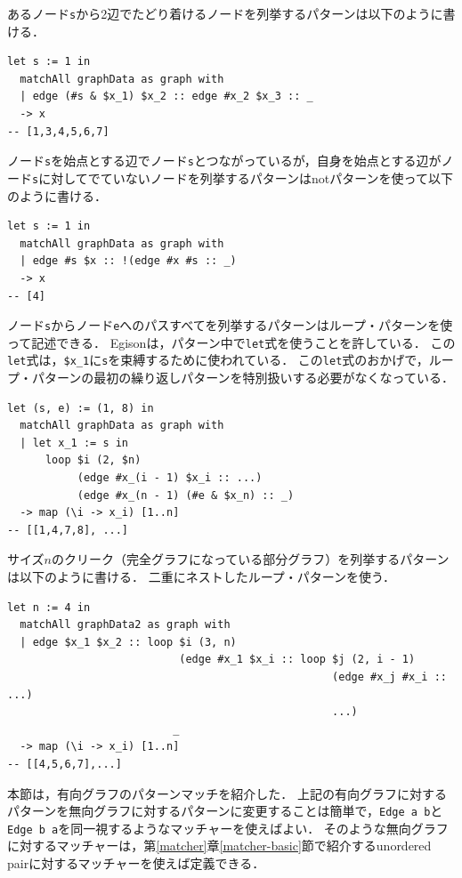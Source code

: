 あるノード\lstinline{s}から2辺でたどり着けるノードを列挙するパターンは以下のように書ける．
\begin{lstlisting}[language=egison,numbers=none]
let s := 1 in
  matchAll graphData as graph with
  | edge (#s & $x_1) $x_2 :: edge #x_2 $x_3 :: _
  -> x
-- [1,3,4,5,6,7]
\end{lstlisting}
ノード\lstinline{s}を始点とする辺でノード\lstinline{s}とつながっているが，自身を始点とする辺がノード\lstinline{s}に対してでていないノードを列挙するパターンはnotパターンを使って以下のように書ける．
\begin{lstlisting}[language=egison,numbers=none]
let s := 1 in
  matchAll graphData as graph with
  | edge #s $x :: !(edge #x #s :: _)
  -> x
-- [4]
\end{lstlisting}
ノード\lstinline{s}からノード\lstinline{e}へのパスすべてを列挙するパターンはループ・パターンを使って記述できる．
Egisonは，パターン中で\lstinline{let}式を使うことを許している．
この\lstinline{let}式は，\lstinline{$x_1}に\lstinline{s}を束縛するために使われている．
この\lstinline{let}式のおかげで，ループ・パターンの最初の繰り返しパターンを特別扱いする必要がなくなっている．
\begin{lstlisting}[language=egison,numbers=none]
let (s, e) := (1, 8) in
  matchAll graphData as graph with
  | let x_1 := s in
      loop $i (2, $n)
           (edge #x_(i - 1) $x_i :: ...)
           (edge #x_(n - 1) (#e & $x_n) :: _)
  -> map (\i -> x_i) [1..n]
-- [[1,4,7,8], ...]
\end{lstlisting}
サイズ$n$のクリーク（完全グラフになっている部分グラフ）を列挙するパターンは以下のように書ける．
二重にネストしたループ・パターンを使う．
\begin{lstlisting}[language=egison,numbers=none]
let n := 4 in
  matchAll graphData2 as graph with
  | edge $x_1 $x_2 :: loop $i (3, n)
                           (edge #x_1 $x_i :: loop $j (2, i - 1)
                                                   (edge #x_j #x_i :: ...)
                                                   ...)
                          _
  -> map (\i -> x_i) [1..n]
-- [[4,5,6,7],...]
\end{lstlisting}

本節は，有向グラフのパターンマッチを紹介した．
上記の有向グラフに対するパターンを無向グラフに対するパターンに変更することは簡単で，\lstinline{Edge a b}と\lstinline{Edge b a}を同一視するようなマッチャーを使えばよい．
そのような無向グラフに対するマッチャーは，第\ref{matcher}章\ref{matcher-basic}節で紹介するunordered pairに対するマッチャーを使えば定義できる．

